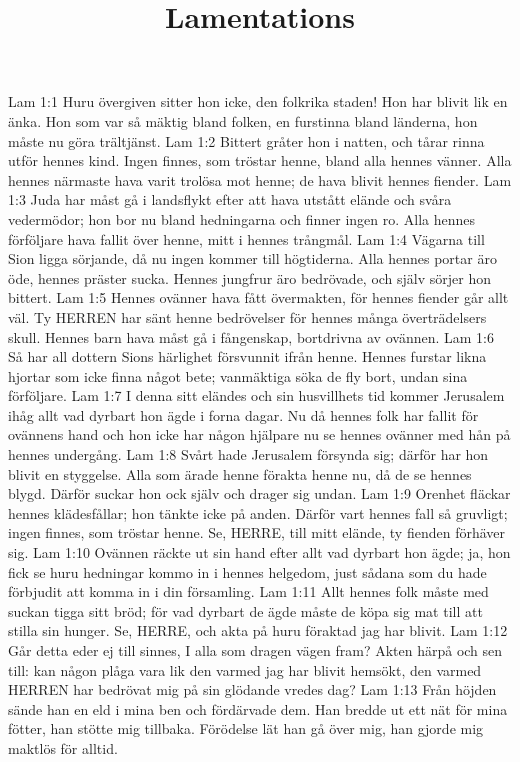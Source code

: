 

\title{Lamentations}

Lam 1:1  Huru övergiven sitter hon icke, den folkrika staden! Hon har blivit lik en änka. Hon som var så mäktig bland folken, en furstinna bland länderna, hon måste nu göra trältjänst.
Lam 1:2  Bittert gråter hon i natten, och tårar rinna utför hennes kind. Ingen finnes, som tröstar henne, bland alla hennes vänner. Alla hennes närmaste hava varit trolösa mot henne; de hava blivit hennes fiender.
Lam 1:3  Juda har måst gå i landsflykt efter att hava utstått elände och svåra vedermödor; hon bor nu bland hedningarna och finner ingen ro. Alla hennes förföljare hava fallit över henne, mitt i hennes trångmål.
Lam 1:4  Vägarna till Sion ligga sörjande, då nu ingen kommer till högtiderna. Alla hennes portar äro öde, hennes präster sucka. Hennes jungfrur äro bedrövade, och själv sörjer hon bittert.
Lam 1:5  Hennes ovänner hava fått övermakten, för hennes fiender går allt väl. Ty HERREN har sänt henne bedrövelser för hennes många överträdelsers skull. Hennes barn hava måst gå i fångenskap, bortdrivna av ovännen.
Lam 1:6  Så har all dottern Sions härlighet försvunnit ifrån henne. Hennes furstar likna hjortar som icke finna något bete; vanmäktiga söka de fly bort, undan sina förföljare.
Lam 1:7  I denna sitt eländes och sin husvillhets tid kommer Jerusalem ihåg allt vad dyrbart hon ägde i forna dagar. Nu då hennes folk har fallit för ovännens hand och hon icke har någon hjälpare nu se hennes ovänner med hån på hennes undergång.
Lam 1:8  Svårt hade Jerusalem försynda sig; därför har hon blivit en styggelse. Alla som ärade henne förakta henne nu, då de se hennes blygd. Därför suckar hon ock själv och drager sig undan.
Lam 1:9  Orenhet fläckar hennes klädesfållar; hon tänkte icke på anden. Därför vart hennes fall så gruvligt; ingen finnes, som tröstar henne. Se, HERRE, till mitt elände, ty fienden förhäver sig.
Lam 1:10  Ovännen räckte ut sin hand efter allt vad dyrbart hon ägde; ja, hon fick se huru hedningar kommo in i hennes helgedom, just sådana som du hade förbjudit att komma in i din församling.
Lam 1:11  Allt hennes folk måste med suckan tigga sitt bröd; för vad dyrbart de ägde måste de köpa sig mat till att stilla sin hunger. Se, HERRE, och akta på huru föraktad jag har blivit.
Lam 1:12  Går detta eder ej till sinnes, I alla som dragen vägen fram? Akten härpå och sen till: kan någon plåga vara lik den varmed jag har blivit hemsökt, den varmed HERREN har bedrövat mig på sin glödande vredes dag?
Lam 1:13  Från höjden sände han en eld i mina ben och fördärvade dem. Han bredde ut ett nät för mina fötter, han stötte mig tillbaka. Förödelse lät han gå över mig, han gjorde mig maktlös för alltid.
